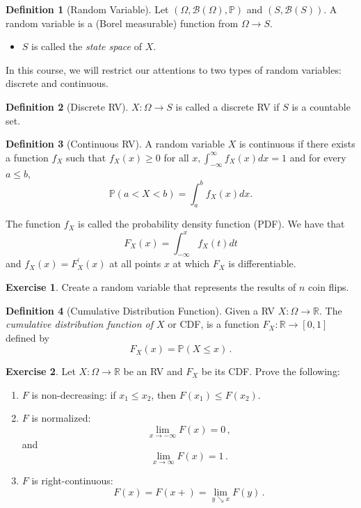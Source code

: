 \documentclass[
  openany]{book}
\providecommand{\tightlist}{%
  \setlength{\itemsep}{0pt}\setlength{\parskip}{0pt}}
\theoremstyle{definition}
\newtheorem{definition}{Definition}[chapter]
\theoremstyle{definition}
\theoremstyle{definition}
\newtheorem{exercise}{Exercise}[chapter]
\theoremstyle{definition}
\theoremstyle{remark}
\begin{document}
\begin{definition}[Random Variable]

Let \((\Omega, \mathcal{B}(\Omega), \mathbb{P})\) and \((S, \mathcal{B}(S))\).
A random variable is a (Borel measurable) function from \(\Omega \to S\).

\begin{itemize}
\tightlist
\item
  \(S\) is called the \emph{state space} of \(X\).
\end{itemize}

\end{definition}

In this course, we will restrict our attentions to two types of random variables: discrete and continuous.

\begin{definition}[Discrete RV]
\(X: \Omega \to S\) is called
a discrete RV if \(S\) is a countable set.
\end{definition}

\begin{definition}[Continuous RV]
A random variable \(X\) is continuous if there exists a function \(f_X\) such that \(f_X(x) \geq 0\)
for all \(x, \int_{-\infty}^{\infty} f_X(x) d x=1\) and for every \(a \leq b\),
\[
\mathbb{P}(a<X<b)=\int_a^b f_X(x) d x .
\]

The function \(f_X\) is called the probability density function (PDF). We have that
\[
F_X(x)=\int_{-\infty}^x f_X(t) d t
\]
and \(f_X(x)=F_X^{\prime}(x)\) at all points \(x\) at which \(F_X\) is differentiable.
\end{definition}

\begin{exercise}
Create a random variable that represents the results of \(n\) coin flips.
\end{exercise}

\begin{definition}[Cumulative Distribution Function]
Given a RV \(X:\Omega \to \mathbb{R}\).
The \emph{cumulative distribution function of \(X\)} or CDF, is
a function \(F_X : \mathbb{R}\to [0,1]\)
defined by
\[ F_X (x) = \mathbb{P}(X \leq x) \,. \]
\end{definition}

\begin{exercise}

Let \(X:\Omega \to \mathbb{R}\) be an RV and \(F_X\) be its CDF.
Prove the following:

\begin{enumerate}
\def\labelenumi{\arabic{enumi}.}
\item
  \(F\) is non-decreasing: if \(x_1 \leq x_2\), then \(F(x_1) \leq F(x_2)\).
\item
  \(F\) is normalized:
  \[ \lim_{x\to -\infty} F(x) = 0 \,,\]
  and
  \[ \lim_{x\to \infty} F(x) = 1 \,.\]
\item
  \(F\) is right-continuous:
  \[ F(x) = F(x+) = \lim_{y \searrow x} F(y) \,.\]
\end{enumerate}

\end{exercise}
\end{document}
